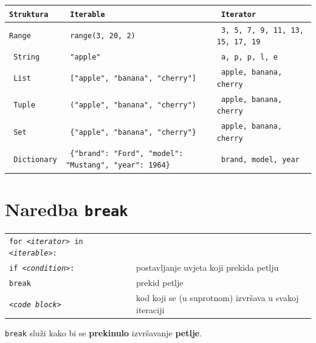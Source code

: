 \documentclass[10pt]{article}
\begin{document}
    \section*{}
    \begin{tabular}{|>{\tt}p{2.00cm}|>{\tt}p{12.00cm}|>{\tt}p{10.50cm}|}
        \hline
        Struktura   & Iterable                                                      & Iterator    \\ \hline
        Range       & range(3, 20, 2)                                               & 3, 5, 7, 9, 11, 13, 15, 17, 19    \\ \hline
        String      & "apple"                                                       & a, p, p, l, e                     \\ \hline
        List        & ["apple", "banana", "cherry"]                                 & apple, banana, cherry             \\ \hline
        Tuple       & ("apple", "banana", "cherry")                                 & apple, banana, cherry             \\ \hline             
        Set         & \{"apple", "banana", "cherry"\}                               & apple, banana, cherry             \\ \hline
        Dictionary  & \{"brand": "Ford", "model": "Mustang", "year": 1964\}         & brand, model, year                \\ \hline
    \end{tabular}

    \section*{\color{NavyBlue} Naredba \texttt{\textbf{break}}}
    \begin{tabular}{|>{\tt}p{9.00cm}|>{}p{15.50cm}|}
        \hline
        for \textit{<iterator>} in \textit{<iterable>}:     &                                                                                                       \\
        \hspace{5mm}if \textit{<condition>}:              & postavljanje uvjeta koji prekida petlju                                                               \\ 
        \hspace{5mm}break                                   & prekid petlje                                                                                         \\ 
        \hspace{5mm}\textit{<code block>}                   & kod koji se (u suprotnom) izvršava u svakoj iteraciji                                                 \\                             
        \hline
    \end{tabular}
    \begin{center}
        \footnotesize
        \texttt{break} služi kako bi se \textbf{prekinulo} izvršavanje \textbf{petlje}.
    \end{center}
\end{document}
